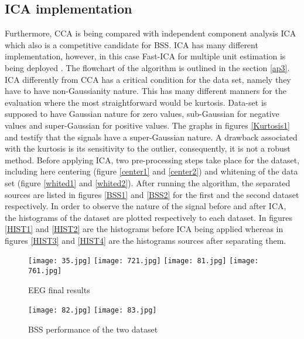 \subsection{ICA implementation}
Furthermore, CCA is being compared with independent component analysis ICA which also is a competitive candidate for BSS. ICA has many different implementation, however, in this case Fast-ICA for multiple unit estimation is being deployed \cite{15}. The flowchart of the algorithm is outlined in the section \ref{ap3}. ICA differently from CCA has a critical condition for the data set, namely they have to have non-Gaussianity nature. This has many different manners for the evaluation where the most straightforward would be kurtosis. Data-set is supposed to have Gaussian nature for zero values, sub-Gaussian for negative values and super-Gaussian for positive values. The graphs in figures \ref{Kurtosis1} and \label{Kurtosis2} testify that the signals have a super-Gaussian nature. A drawback associated with the kurtosis is its sensitivity to the outlier, consequently, it is not a robust method. Before applying ICA, two pre-processing steps take place for the dataset, including here centering (figure \ref{center1} and \ref{center2}) and whitening of the data set (figure \ref{whited1} and \ref{whited2}). After running the algorithm, the separated sources are listed in figures \ref{BSS1} and \ref{BSS2} for the first and the second dataset respectively. In order to observe the nature of the signal before and after ICA, the histograms of the dataset are plotted respectively to each dataset. In figures \ref{HIST1} and \ref{HIST2} are the histograms before ICA being applied whereas in figures \ref{HIST3} and \ref{HIST4} are the histograms sources after separating them. 


\begin{figure}[!htbp]
%
\centering
\texttt{[image: 35.jpg]}
\texttt{[image: 721.jpg]}
\label{Nadya6}
\endminipage\hfill
{}%
\centering
\texttt{[image: 81.jpg]}
\texttt{[image: 761.jpg]}
\label{Nadya7}
\endminipage\hfill
\caption{EEG final results}\label{Perfor}
\end{figure}


\begin{figure}[!htbp]
%
\centering
\texttt{[image: 82.jpg]}
\label{SAR}
\endminipage\hfill
{}%
\centering
\texttt{[image: 83.jpg]}
\label{SDR}
\endminipage\hfill
\caption{BSS performance of the two dataset}\label{Perfor1}
\end{figure}

